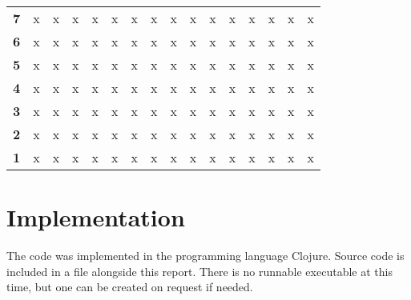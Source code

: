 \documentclass{article}
\begin{document}
\begin{table}[H]
\begin{tabular}{llllllllllllllll}
\multicolumn{1}{l|}{\textbf{7}}  & x          & x          & x          & x          & x          & x          & x          & x          & x          & x          & x          & x          & x          & x          & x          \\
\multicolumn{1}{l|}{\textbf{6}}  & x          & x          & x          & x          & x          & x          & x          & x          & x          & x          & x          & x          & x          & x          & x          \\
\multicolumn{1}{l|}{\textbf{5}}  & x          & x          & x          & x          & x          & x          & x          & x          & x          & x          & x          & x          & x          & x          & x          \\
\multicolumn{1}{l|}{\textbf{4}}  & x          & x          & x          & x          & x          & x          & x          & x          & x          & x          & x          & x          & x          & x          & x          \\
\multicolumn{1}{l|}{\textbf{3}}  & x          & x          & x          & x          & x          & x          & x          & x          & x          & x          & x          & x          & x          & x          & x          \\
\multicolumn{1}{l|}{\textbf{2}}  & x          & x          & x          & x          & x          & x          & x          & x          & x          & x          & x          & x          & x          & x          & x          \\
\multicolumn{1}{l|}{\textbf{1}}  & x          & x          & x          & x          & x          & x          & x          & x          & x          & x          & x          & x          & x          & x          & x         
\end{tabular}
\end{table}


\section*{Implementation}
The code was implemented in the programming language Clojure. Source code is included in a file alongside this report. There is no runnable executable at this time, but one can be created on request if needed.
    
\end{document}

